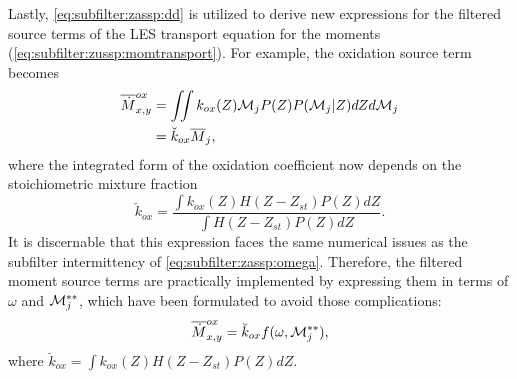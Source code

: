 Lastly, \cref{eq:subfilter:zassp:dd} is utilized to derive new expressions for the filtered source terms of the LES transport equation for the moments (\cref{eq:subfilter:zussp:momtransport}). For example, the oxidation source term becomes
\begin{equation}\label{eq:subfilter:zassp:ox}
  \begin{split}
    \overline{\dot{M}}_{x,y}^{ox} &= \iint k_{ox}(Z)\mathcal{M}_jP(Z)P(\mathcal{M}_j|Z) dZ d\mathcal{M}_j \\
    &= \check{k}_{ox}\overline{M}_j,
  \end{split}
\end{equation}
where the integrated form of the oxidation coefficient now depends on the stoichiometric mixture fraction
\begin{equation}\label{eq:subfilter:zassp:kox}
  \check{k}_{ox} = \frac{\int k_{ox}(Z)H(Z - Z_{st})P(Z)dZ}{\int H(Z - Z_{st})P(Z)dZ}.
\end{equation}
It is discernable that this expression faces the same numerical issues as the subfilter intermittency of \cref{eq:subfilter:zassp:omega}. Therefore, the filtered moment source terms are practically implemented by expressing them in terms of $\omega$ and $\mathcal{M}_j^{**}$, which have been formulated to avoid those complications:
\begin{equation}\label{eq:subfilter:zassp:practicalox}
  \overline{\dot{M}}_{x,y}^{ox} = \breve{k}_{ox}f(\omega,\mathcal{M}_j^{**}),
\end{equation}
where $\breve{k}_{ox} = \int k_{ox}(Z)H(Z - Z_{st})P(Z)dZ$.
